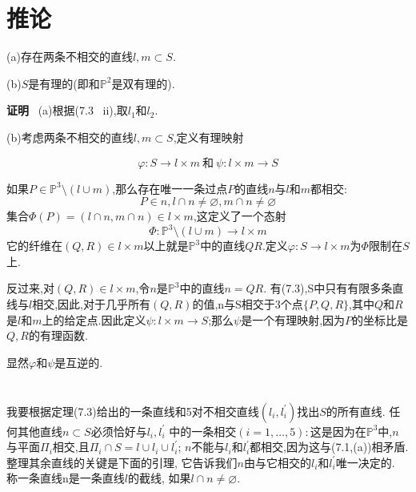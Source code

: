 \documentclass[UTF8]{book}
\begin{document}
	\section{推论}
	(a)存在两条不相交的直线$l,m \subset S$.
	
	(b)$ S $是有理的(即和$\mathbb{P}^{2}$是双有理的).
	
	\textbf{证明} \ (a)根据(7.3 \ ii),取$l_{1}$和$l_{2}$.
	
	(b)考虑两条不相交的直线$l,m\subset S$,定义有理映射
	
	\begin{equation*}
	\varphi :S\rightarrow l \times m  \  \text{和} \ \psi :l \times m \rightarrow S
	\end{equation*}
	
	如果$P\in \mathbb{P} ^{3}\setminus (l\cup m) $,那么存在唯一一条过点$ P $的直线$n$与$l$和$m$都相交:
	\begin{equation*}
	P\in n, l\cap n \neq \varnothing, m\cap n\neq  \varnothing
	\end{equation*}
	集合$\Phi(P)=(l\cap n,m\cap n)\in l\times m$,这定义了一个态射
	\begin{equation*}
	\Phi:\mathbb{P} ^{3}\setminus (l\cup m)\rightarrow l \times m
	\end{equation*}
	它的纤维在$(Q,R)\in l\times m$以上就是$\mathbb{P} ^{3}$中的直线$ QR. $定义$\varphi :S\rightarrow l \times m  $为$\Phi$限制在$ S $上.
	
	反过来,对$(Q,R)\in l \times m$,令$n$是$\mathbb{P} ^{3}$中的直线$ n=QR $. 有(7.3),S中只有有限多条直线与$l$相交,因此,对于几乎所有$ (Q,R) $的值,n与S相交于3个点$ \{P, Q, R\} $,其中$ Q $和$ R $是$l$和$m$上的给定点.因此定义$\psi:l \times m \rightarrow S $;那么$\psi$是一个有理映射,因为$ P $的坐标比是$ Q ,R $的有理函数.
	
	显然$\varphi$和$\psi$是互逆的.
	
	\section{}
	我要根据定理(7.3)给出的一条直线和5对不相交直线$(l_{i},l^{'}_{i})$找出$ S $的所有直线. 任何其他直线$n\subset S$必须恰好与$l_{i},l^{'}_{i}$ 中的一条相交$ (i = 1,...,5): $这是因为在$\mathbb{P}^{3}$中,$ n $与平面$\Pi_{i}$相交,且$\Pi_{i}\cap S=l\cup l_{i} \cup l^{'}_{i}$; $ n $不能与$l_{i}$和$l^{'}_{i}$都相交,因为这与(7.1,(a))相矛盾. 整理其余直线的关键是下面的引理, 它告诉我们$ n $由与它相交的$l_{i}$和$l^{'}_{i}$唯一决定的. 称一条直线n是一条直线$l$的截线, 如果$l\cap n \neq \varnothing$.
	
\end{document}
